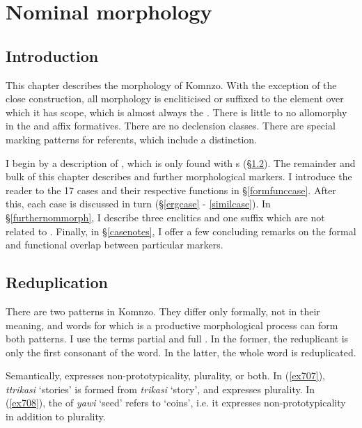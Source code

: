 \chapter{Nominal morphology}
\label{cha:nominals-chapter}

\section{Introduction} \label{nommorphintro}

This chapter describes the  morphology of Komnzo. With the exception of the close  construction, all  morphology is encliticised or suffixed to the element over which it has scope, which is almost always the . There is little to no allomorphy in the  and affix formatives. There are no declension classes. There are special marking patterns for  referents, which include a  distinction.

I begin by a description of , which is only found with s ({\S}\ref{nomreduplication}). The remainder and bulk of this chapter describes  and further morphological markers. I introduce the reader to the 17 cases and their respective functions in {\S}\ref{formfunccase}. After this, each case is discussed in turn ({\S}\ref{ergcase} - \ref{similcase}). In {\S}\ref{furthernommorph}, I describe three enclitics and one suffix which are not related to . Finally, in {\S}\ref{casenotes}, I offer a few concluding remarks on the formal and functional overlap between particular  markers.

\section{Reduplication}\label{nomreduplication}

There are two  patterns in Komnzo. They differ only formally, not in their meaning, and words for which  is a productive morphological process can form both patterns. I use the terms partial  and full . In the former, the reduplicant is only the first consonant of the word. In the latter, the whole word is reduplicated.

Semantically,  expresses non-prototypicality, plurality, or both. In (\ref{ex707}), \emph{ttrikasi} `stories' is formed from \emph{trikasi} `story', and  expresses plurality. In (\ref{ex708}), the  of \emph{yawi} `seed' refers to `coins', i.e. it expresses non-prototypicality in addition to plurality. 

